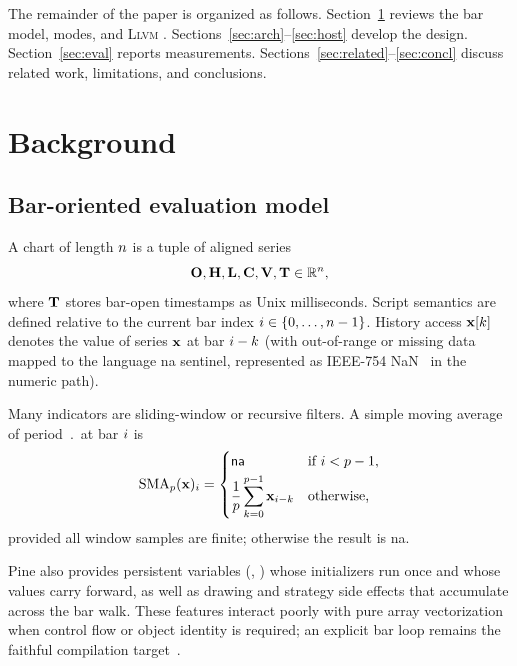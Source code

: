 \documentclass[11pt,a4paper]{article}
\newcommand{\llvm}{\textsc{Llvm}}
\renewcommand{\na}{\textsf{na}}
\begin{document}
The remainder of the paper is organized as follows.
Section~\ref{sec:bg} reviews the bar model, \numba{} modes, and \llvm{} \jit{}.
Sections~\ref{sec:arch}--\ref{sec:host} develop the design.
Section~\ref{sec:eval} reports measurements.
Sections~\ref{sec:related}--\ref{sec:concl} discuss related work, limitations,
and conclusions.

\section{Background}
\label{sec:bg}

\subsection{Bar-oriented evaluation model}
\label{sec:bg-bars}

A chart of length $n$ is a tuple of aligned series
\begin{equation}
  \mathbf{O},\mathbf{H},\mathbf{L},\mathbf{C},\mathbf{V},\mathbf{T}
  \in \mathbb{R}^{n},
\end{equation}
where $\mathbf{T}$ stores bar-open timestamps as Unix milliseconds.
Script semantics are defined relative to the current bar index
$i \in \{0,\ldots,n-1\}$. History access $\mathbf{x}[k]$ denotes the
value of series $\mathbf{x}$ at bar $i-k$ (with out-of-range or missing
data mapped to the language \na{} sentinel, represented as IEEE-754
NaN~\citep{ieee754} in the numeric path).

Many indicators are sliding-window or recursive filters. A simple moving
average of period $\period$ at bar $i$ is
\begin{equation}
  \label{eq:sma}
  \mathrm{SMA}_{\period}(\series{x})_{\baridx}
  =
  \begin{cases}
    \na & \text{if }\baridx < \period-1,\\[2pt]
    \dfrac{1}{\period}\displaystyle\sum_{k=0}^{\period-1}
      \series{x}_{\baridx-k}
      & \text{otherwise,}
  \end{cases}
\end{equation}
provided all window samples are finite; otherwise the result is \na{}.

Pine also provides persistent variables (, ) whose
initializers run once and whose values carry forward, as well as drawing and
strategy side effects that accumulate across the bar walk. These features
interact poorly with pure array vectorization when control flow or
object identity is required; an explicit bar loop remains the faithful
compilation target~\citep{nystrom2021crafting,aho2006dragon}.
\end{document}
